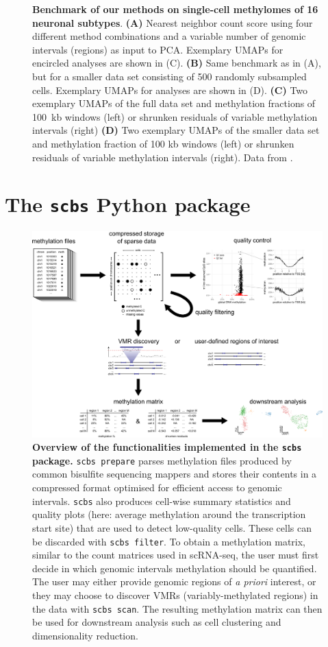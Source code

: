 \documentclass[twocolumn,10pt]{article}
\begin{document}
\begin{figure}
\begin{center}
    \caption{\small \textbf{Benchmark of our methods on single-cell methylomes of 16 neuronal subtypes}. \textbf{(A)} Nearest neighbor count score using four different method combinations and a variable number of genomic intervals (regions) as input to PCA. Exemplary UMAPs for encircled analyses are shown in (C). \textbf{(B)} Same benchmark as in (A), but for a smaller data set consisting of 500 randomly subsampled cells. Exemplary UMAPs for analyses are shown in (D). \textbf{(C)} Two exemplary UMAPs of the full data set and methylation fractions of 100~kb windows (left) or shrunken residuals of variable methylation intervals (right) \textbf{(D)} Two exemplary UMAPs of the smaller data set and methylation fraction of 100 kb windows (left) or shrunken residuals of variable methylation intervals (right). Data from \citet{luo2017single}.}
    \label{figure:score}
    \end{center}
\end{figure}

\section{The \texttt{scbs} Python package}

\begin{figure}
	\begin{center}
		\includegraphics[width=.8\textwidth]{figures/Fig_workflow.png}
	\end{center}
	\caption{\small \textbf{Overview of the functionalities implemented in the \texttt{scbs} package.}
		\texttt{scbs prepare} parses methylation files produced by common bisulfite sequencing mappers and stores their contents in a compressed format optimised for efficient access to genomic intervals.
		\texttt{scbs} also produces cell-wise summary statistics and quality plots (here: average methylation around the transcription start site) that are used to detect low-quality cells.
		These cells can be discarded with \texttt{scbs filter}.
		To obtain a methylation matrix, similar to the count matrices used in scRNA-seq, the user must first decide in which genomic intervals methylation should be quantified.
		The user may either provide genomic regions of \emph{a priori} interest, or they may choose to discover VMRs (variably-methylated regions) in the data with \texttt{scbs scan}.
		The resulting methylation matrix can then be used for downstream analysis such as cell clustering and dimensionality reduction.
	}
	\label{workflow}
\end{figure}
\end{document}
